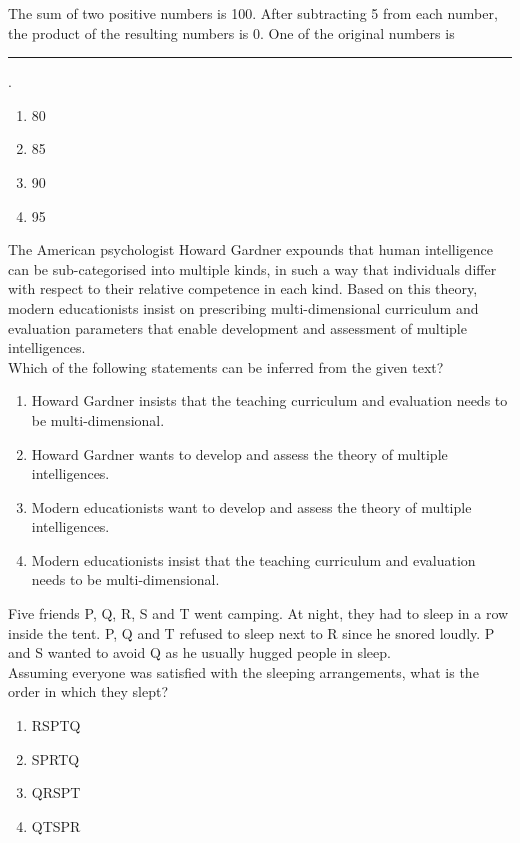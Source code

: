 \item The sum of two positive numbers is 100. After subtracting 5 from each number, the product of the resulting numbers is 0. One of the original numbers is \rule{1cm}{0.4pt}.
	\begin{enumerate}
                \item 80       
                \item 85       
                \item 90       
                \item 95       
        \end{enumerate}

\item The American psychologist Howard Gardner expounds that human intelligence can be sub-categorised into multiple kinds, in such a way that individuals differ with respect to their relative competence in each kind. Based on this theory, modern educationists insist on prescribing multi-dimensional curriculum and evaluation parameters that enable development and assessment of multiple intelligences. \\
Which of the following statements can be inferred from the given text?
	\begin{enumerate}
                \item Howard Gardner insists that the teaching curriculum and evaluation needs to be multi-dimensional.
                \item Howard Gardner wants to develop and assess the theory of multiple intelligences.
                \item Modern educationists want to develop and assess the theory of multiple intelligences.
                \item Modern educationists insist that the teaching curriculum and evaluation needs to be multi-dimensional.
        \end{enumerate}
\item Five friends P, Q, R, S and T went camping. At night, they had to sleep in a row inside the tent. P, Q and T refused to sleep next to R since he snored loudly. P and S wanted to avoid Q as he usually hugged people in sleep. \\
Assuming everyone was satisfied with the sleeping arrangements, what is the order in which they slept?
	\begin{enumerate}
                \item RSPTQ 
                \item SPRTQ
                \item QRSPT
                \item QTSPR
        \end{enumerate}

